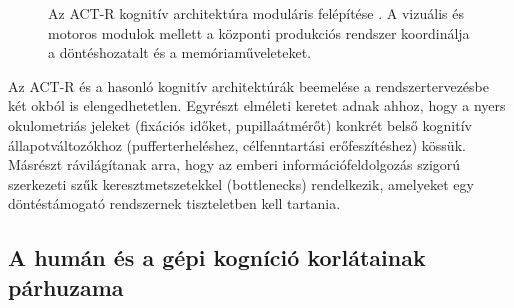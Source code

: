 \documentclass[12pt,a4paper,oneside]{book}
\begin{document}
\begin{figure}[H]
    \centering
    \caption{Az ACT-R kognitív architektúra moduláris felépítése \cite{anderson2007}. A vizuális és motoros modulok mellett a központi produkciós rendszer koordinálja a döntéshozatalt és a memóriaműveleteket.}
    \label{fig:actr_architecture}
\end{figure}

Az ACT-R és a hasonló kognitív architektúrák beemelése a rendszertervezésbe két okból is elengedhetetlen. Egyrészt elméleti keretet adnak ahhoz, hogy a nyers okulometriás jeleket (fixációs időket, pupillaátmérőt) konkrét belső kognitív állapotváltozókhoz (pufferterheléshez, célfenntartási erőfeszítéshez) kössük. Másrészt rávilágítanak arra, hogy az emberi információfeldolgozás szigorú szerkezeti szűk keresztmetszetekkel (bottlenecks) rendelkezik, amelyeket egy döntéstámogató rendszernek tiszteletben kell tartania.

\subsection{A humán és a gépi kogníció korlátainak párhuzama}
\end{document}
